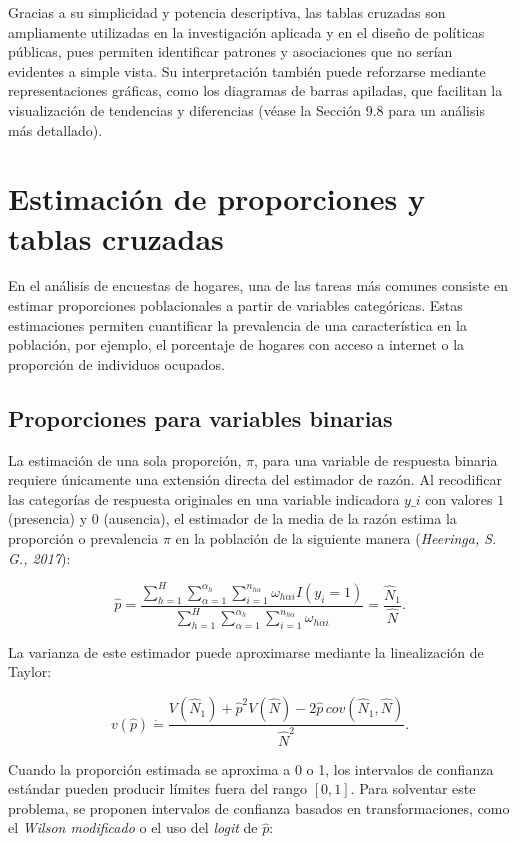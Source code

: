 \documentclass[
  12pt,
]{book}
\begin{document}
Gracias a su simplicidad y potencia descriptiva, las tablas cruzadas son ampliamente utilizadas en la investigación aplicada y en el diseño de políticas públicas, pues permiten identificar patrones y asociaciones que no serían evidentes a simple vista. Su interpretación también puede reforzarse mediante representaciones gráficas, como los diagramas de barras apiladas, que facilitan la visualización de tendencias y diferencias (véase la Sección 9.8 para un análisis más detallado).

\section{Estimación de proporciones y tablas cruzadas}\label{estimaciuxf3n-de-proporciones-y-tablas-cruzadas}

En el análisis de encuestas de hogares, una de las tareas más comunes consiste en estimar proporciones poblacionales a partir de variables categóricas. Estas estimaciones permiten cuantificar la prevalencia de una característica en la población, por ejemplo, el porcentaje de hogares con acceso a internet o la proporción de individuos ocupados.

\subsection{Proporciones para variables binarias}\label{proporciones-para-variables-binarias}

La estimación de una sola proporción, \(\pi\), para una variable de respuesta binaria requiere únicamente una extensión directa del estimador de razón. Al recodificar las categorías de respuesta originales en una variable indicadora \(y\_{i}\) con valores \(1\) (presencia) y \(0\) (ausencia), el estimador de la media de la razón estima la proporción o prevalencia \(\pi\) en la población de la siguiente manera (\emph{Heeringa, S. G., 2017}):

\[
\hat{p} = \frac{\sum_{h=1}^{H}\sum_{\alpha=1}^{\alpha_{h}}\sum_{i=1}^{n_{h\alpha}} \omega_{h\alpha i}I(y_{i}=1)}{\sum_{h=1}^{H}\sum_{\alpha=1}^{\alpha_{h}}\sum_{i=1}^{n_{h\alpha}} \omega_{h\alpha i}}
= \frac{\hat{N}_{1}}{\hat{N}}.
\]

La varianza de este estimador puede aproximarse mediante la linealización de Taylor:

\[
v(\hat{p}) \dot{=} \frac{V(\hat{N}_{1})+\hat{p}^{2}V(\hat{N})-2\hat{p}\,cov(\hat{N}_{1},\hat{N})}{\hat{N}^{2}}.
\]

Cuando la proporción estimada se aproxima a 0 o 1, los intervalos de confianza estándar pueden producir límites fuera del rango \([0,1]\). Para solventar este problema, se proponen intervalos de confianza basados en transformaciones, como el \emph{Wilson modificado} o el uso del \emph{logit} de \(\hat{p}\):
\end{document}
